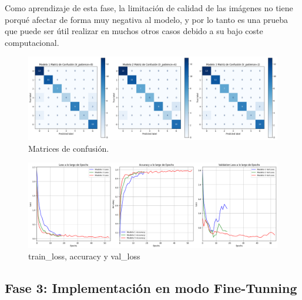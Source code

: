 \quad

\noindent
Como aprendizaje de esta fase, la limitación de calidad de las imágenes no tiene porqué afectar
de forma muy negativa al modelo, y por lo tanto es una prueba que puede ser útil realizar en muchos 
otros casos debido a su bajo coste computacional.
\quad

\begin{figure}[H]
    \centering
    \centering
    \includegraphics[width=\textwidth]{imagenes/confusion_matrix_a_quitar.png}
    \caption{Matrices de confusión.}
    \label{fig:confusion_matrix}
\end{figure}

\begin{figure}[H]
    \centering
    \centering
    \includegraphics[width=\textwidth]{imagenes/loss_accuracy_validation_a_quitar.png}
    \caption{train\_loss, accuracy y val\_loss}
    \label{fig:loss_accuracy_validation}
\end{figure}


\subsection{Fase 3: Implementación en modo Fine-Tunning}

